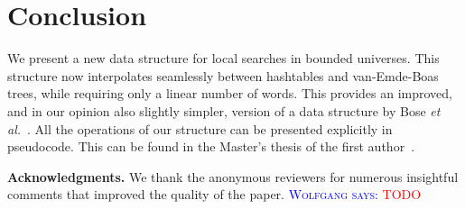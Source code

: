 \documentclass[a4paper,11pt]{article}
\newcommand{\etal}{\emph{et al.}\xspace}
\newcommand{\?}{\mskip1.5mu}
\newcommand{\aremark}[3]{\textcolor{blue}{\textsc{#1 #2:}}
  \textcolor{red}{\textsf{#3}}}
\newcommand{\wolfgang}[2][says]{\aremark{Wolfgang}{#1}{#2}}
\begin{document}
\section{Conclusion}

We present a new data structure for local searches
in bounded universes. This structure now interpolates
seamlessly between hashtables and van-Emde-Boas trees,
while requiring only a linear number of words. This provides
an improved, and in our opinion also slightly simpler, version
of a data structure by Bose \etal~\cite{BoseDoDuHoMo13}.
All the operations of our structure can be
presented explicitly in pseudocode. This can be found in the
Master's thesis of the first author~\cite{Ehrhardt15}.

\bigskip
\noindent\textbf{Acknowledgments.}
We thank the anonymous reviewers for numerous
insightful comments that improved the quality of the paper.
\wolfgang{TODO}





\end{document}
